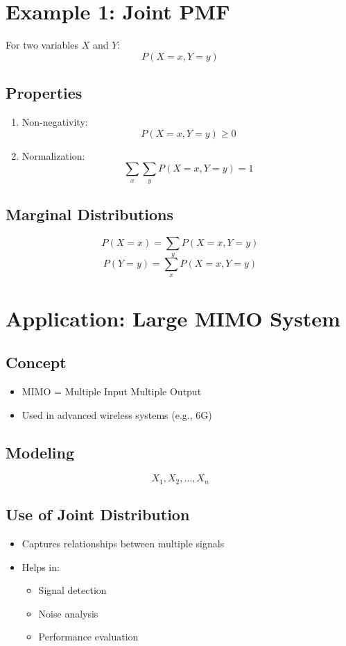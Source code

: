 \documentclass[12pt]{article}
\begin{document}
\section*{Example 1: Joint PMF}

For two variables $X$ and $Y$:
\[
P(X=x, Y=y)
\]

\subsection*{Properties}
\begin{enumerate}
    \item Non-negativity:
    \[
    P(X=x, Y=y) \ge 0
    \]
    \item Normalization:
    \[
    \sum_x \sum_y P(X=x, Y=y) = 1
    \]
\end{enumerate}

\subsection*{Marginal Distributions}
\[
P(X=x) = \sum_y P(X=x, Y=y)
\]
\[
P(Y=y) = \sum_x P(X=x, Y=y)
\]

\section*{Application: Large MIMO System}

\subsection*{Concept}
\begin{itemize}
    \item MIMO = Multiple Input Multiple Output
    \item Used in advanced wireless systems (e.g., 6G)
\end{itemize}

\subsection*{Modeling}
\[
X_1, X_2, \dots, X_n
\]

\subsection*{Use of Joint Distribution}
\begin{itemize}
    \item Captures relationships between multiple signals
    \item Helps in:
    \begin{itemize}
        \item Signal detection
        \item Noise analysis
        \item Performance evaluation
    \end{itemize}
\end{itemize}
\end{document}

